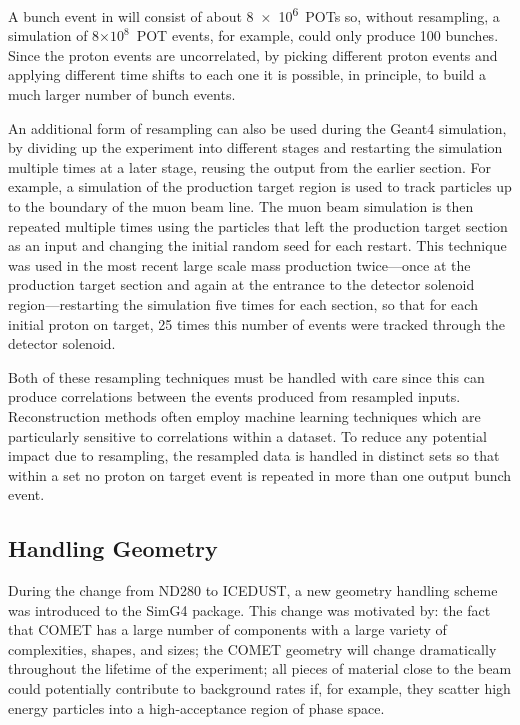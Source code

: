 A bunch event in \phaseI will consist of about \num{8e6}~\acp{POT} so, without resampling, a simulation of 8$\times10^{8}$~\ac{POT} events, for example, could only produce 100 bunches.
Since the proton events are uncorrelated, by picking different proton events and applying different time shifts to each one it is possible, in principle, to build a much larger number of bunch events.

An additional form of resampling can also be used during the Geant4 simulation, by dividing up the experiment into different stages and restarting the simulation multiple times at a later stage, reusing the output from the earlier section.
For example, a simulation of the production target region is used to track particles up to the boundary of the muon beam line.
The muon beam simulation is then repeated multiple times using the particles that left the production target section as an input and changing the initial random seed for each restart.
This technique was used in the most recent large scale mass production twice---once at the production target section and again at the entrance to the detector solenoid region---restarting the simulation five times for each section, so that for each initial proton on target, 25 times this number of events were tracked through the detector solenoid.

Both of these resampling techniques must be handled with care since this can produce correlations between the events produced from resampled inputs.
Reconstruction methods often employ machine learning techniques which are particularly sensitive to correlations within a dataset.
To reduce any potential impact due to resampling, the resampled data is handled in distinct sets so that within a set no proton on target event is repeated in more than one output bunch event.

\subsection{Handling Geometry}
During the change from ND280 to ICEDUST, a new geometry handling scheme was introduced to the SimG4 package.
This change was motivated by: 
    the fact that COMET has a large number of components with a large variety of complexities, shapes, and sizes;
    the COMET geometry will change dramatically throughout the lifetime of the experiment;
    all pieces of material close to the beam could potentially contribute to background rates if, for example, they scatter high energy particles into a high-acceptance region of phase space.

